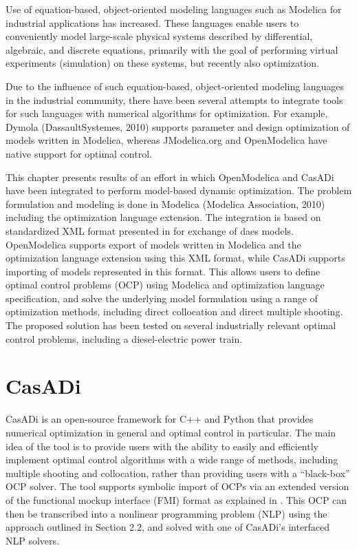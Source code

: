 Use of equation-based, object-oriented modeling languages such as Modelica for
industrial applications has increased. These languages enable users to conveniently model large-scale physical systems described by 
differential, algebraic, and discrete equations, primarily with the goal of performing virtual experiments (simulation) 
on these systems, but recently also optimization.

Due to the influence of such equation-based, object-oriented modeling languages in the industrial community, there have
been several attempts to integrate tools for such languages with numerical algorithms for optimization. For example,
Dymola (DassaultSystemes, 2010) supports parameter and design optimization of models written in Modelica, whereas
JModelica.org \cite{akesson} and OpenModelica \cite{bernhard} have native support for optimal
control.

This chapter presents results of an effort in which OpenModelica and CasADi \cite{casadi} have been integrated to perform model-based dynamic optimization. The problem formulation and modeling is done in Modelica 
(Modelica Association, 2010) including the optimization \cite{optimica} language extension. The integration is based
on standardized XML format presented in \cite{xml} for exchange of \acrshort{daes} models. 
OpenModelica supports export of models written in Modelica and the optimization language extension using this XML 
format, while CasADi supports importing of models represented in this format. This allows users to define optimal control problems (OCP) using
Modelica and optimization language specification, and solve the underlying model formulation using a
range of optimization methods, including direct collocation and direct multiple shooting. The proposed
solution has been tested on several industrially relevant optimal control problems, including a diesel-electric
power train.

\section{CasADi}
\label{sec:optcasadi}

CasADi \cite{casadi} is an open-source framework for C++ and Python that provides numerical optimization in general and optimal control in particular. The main idea of the tool is to provide users with the ability to easily and efficiently implement optimal control algorithms with a wide range of methods, including multiple shooting and collocation, rather than providing users with a “black-box” OCP solver.
The tool supports symbolic import of OCPs via an extended version of the functional mockup interface (FMI) format as explained in \cite{optandersson}. This OCP can then be transcribed into a nonlinear programming problem (NLP) using the approach outlined in Section 2.2, and solved with one of CasADi’s interfaced NLP solvers.

